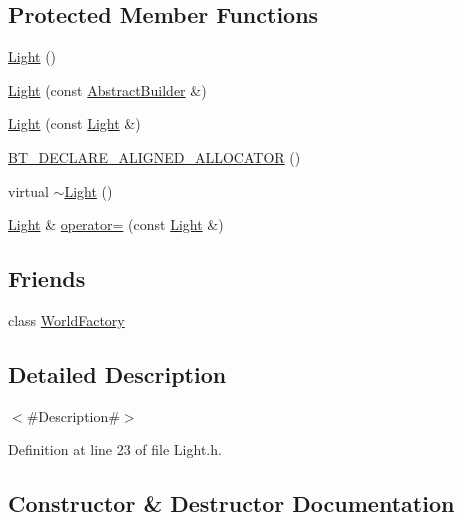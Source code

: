 \subsection*{Protected Member Functions}
\begin{DoxyCompactItemize}
\item 
\mbox{\hyperlink{classnjli_1_1_light_ae0e78a73e2bef4d00deda48fe5cd08e8}{Light}} ()
\item 
\mbox{\hyperlink{classnjli_1_1_light_a2edf4d7c92dea0c8f1525b86967a0784}{Light}} (const \mbox{\hyperlink{classnjli_1_1_abstract_builder}{Abstract\+Builder}} \&)
\item 
\mbox{\hyperlink{classnjli_1_1_light_aee08c07de527987355ec28780054bf18}{Light}} (const \mbox{\hyperlink{classnjli_1_1_light}{Light}} \&)
\item 
\mbox{\hyperlink{classnjli_1_1_light_a1b79e3b111727895a7eadf347c5b1d12}{B\+T\+\_\+\+D\+E\+C\+L\+A\+R\+E\+\_\+\+A\+L\+I\+G\+N\+E\+D\+\_\+\+A\+L\+L\+O\+C\+A\+T\+OR}} ()
\item 
virtual \mbox{\hyperlink{classnjli_1_1_light_af9cb1cf3a119efa14d13a74193b4b941}{$\sim$\+Light}} ()
\item 
\mbox{\hyperlink{classnjli_1_1_light}{Light}} \& \mbox{\hyperlink{classnjli_1_1_light_aea305e92709425c1617943175bd34542}{operator=}} (const \mbox{\hyperlink{classnjli_1_1_light}{Light}} \&)
\end{DoxyCompactItemize}
\subsection*{Friends}
\begin{DoxyCompactItemize}
\item 
class \mbox{\hyperlink{classnjli_1_1_light_acb96ebb09abe8f2a37a915a842babfac}{World\+Factory}}
\end{DoxyCompactItemize}


\subsection{Detailed Description}
$<$\#\+Description\#$>$ 

Definition at line 23 of file Light.\+h.



\subsection{Constructor \& Destructor Documentation}
\mbox{\label{classnjli_1_1_light_ae0e78a73e2bef4d00deda48fe5cd08e8}} 
